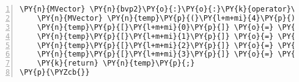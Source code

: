 \begin{Verbatim}[tabsize=2,commandchars=\\\{\},numbers=left,firstnumber=1,stepnumber=1]
\PY{n}{MVector} \PY{n}{bvp2}\PY{o}{:}\PY{o}{:}\PY{k}{operator}\PY{p}{(}\PY{p}{)}\PY{p}{(}\PY{k}{const} \PY{k+kt}{double}\PY{o}{\PYZam{}} \PY{n}{x}\PY{p}{,} \PY{k}{const} \PY{n}{MVector}\PY{o}{\PYZam{}} \PY{n}{y}\PY{p}{)}\PY{p}{\PYZob{}}
	\PY{n}{MVector} \PY{n}{temp}\PY{p}{(}\PY{l+m+mi}{4}\PY{p}{)}\PY{p}{;}
	\PY{n}{temp}\PY{p}{[}\PY{l+m+mi}{0}\PY{p}{]} \PY{o}{=} \PY{n}{y}\PY{p}{[}\PY{l+m+mi}{1}\PY{p}{]}\PY{p}{;}
	\PY{n}{temp}\PY{p}{[}\PY{l+m+mi}{1}\PY{p}{]} \PY{o}{=} \PY{l+m+mi}{4} \PY{o}{+} \PY{p}{(}\PY{l+m+mf}{1.}\PY{o}{/}\PY{l+m+mf}{4.}\PY{p}{)}\PY{o}{*}\PY{n}{x}\PY{o}{*}\PY{n}{x}\PY{o}{*}\PY{n}{x} \PY{o}{\PYZhy{}} \PY{p}{(}\PY{l+m+mf}{1.}\PY{o}{/}\PY{l+m+mf}{8.}\PY{p}{)}\PY{o}{*}\PY{n}{y}\PY{p}{[}\PY{l+m+mi}{0}\PY{p}{]}\PY{o}{*}\PY{n}{y}\PY{p}{[}\PY{l+m+mi}{1}\PY{p}{]}\PY{p}{;}
	\PY{n}{temp}\PY{p}{[}\PY{l+m+mi}{2}\PY{p}{]} \PY{o}{=} \PY{n}{y}\PY{p}{[}\PY{l+m+mi}{3}\PY{p}{]}\PY{p}{;}
	\PY{n}{temp}\PY{p}{[}\PY{l+m+mi}{3}\PY{p}{]} \PY{o}{=} \PY{p}{(}\PY{o}{\PYZhy{}}\PY{l+m+mf}{1.}\PY{o}{/}\PY{l+m+mf}{8.}\PY{p}{)}\PY{o}{*}\PY{p}{(}\PY{n}{y}\PY{p}{[}\PY{l+m+mi}{1}\PY{p}{]}\PY{o}{*}\PY{n}{y}\PY{p}{[}\PY{l+m+mi}{2}\PY{p}{]} \PY{o}{+} \PY{n}{y}\PY{p}{[}\PY{l+m+mi}{0}\PY{p}{]}\PY{o}{*}\PY{n}{y}\PY{p}{[}\PY{l+m+mi}{3}\PY{p}{]}\PY{p}{)}\PY{p}{;}
	\PY{k}{return} \PY{n}{temp}\PY{p}{;}
\PY{p}{\PYZcb{}}
\end{Verbatim}
